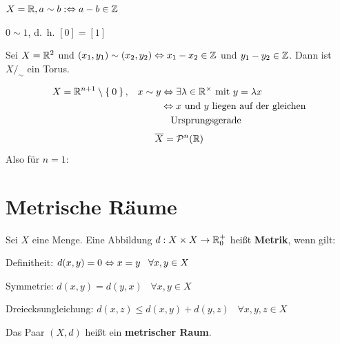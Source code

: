 \begin{beispiel}
    $X = \mathbb{R}, a \sim b :\Leftrightarrow a-b \in \mathbb{Z}$
    
    

    $0 \sim 1$, d.~h. $[0] = [1]$
\end{beispiel}

\begin{beispiel}
    Sei $X = \mathbb{R}^2$ und $(x_1, y_1) \sim (x_2, y_2) \Leftrightarrow x_1 - x_2 \in \mathbb{Z}$ 
    und $y_1 - y_2 \in \mathbb{Z}$. Dann ist $X /_\sim$ ein Torus.
\end{beispiel}

\begin{beispiel}%
    \begin{align*}
        X= \mdr^{n+1} \setminus \Set{0},\;\;\; x \sim y &\gdw \exists \lambda \in \mdr^\times \text{ mit } y = \lambda x\\
            &\gdw x \text{ und } y \text{ liegen auf der gleichen}\\
            &\hphantom{\gdw} \text{Ursprungsgerade}
    \end{align*}
    \[\overline{X} = \mathcal{P}^n(\mathbb{R})\]
    Also für $n=1$:\nopagebreak\\
    
\end{beispiel}

\section{Metrische Räume}
\begin{definition}%
    Sei $X$ eine Menge. Eine Abbildung $d:X\times X \rightarrow \mathbb{R}_0^+$
    heißt \textbf{Metrik}, wenn gilt:

    \begin{defenumprops}
        \item Definitheit:         \tabto{4cm} $d(x,y) = 0 \Leftrightarrow x = y \;\;\; \forall x, y \in X$
        \item Symmetrie:           \tabto{4cm} $d(x,y) = d(y,x) \;\;\; \forall x, y \in X$
        \item Dreiecksungleichung: \tabto{4cm} $d(x,z) \leq d(x,y) + d(y,z) \;\;\; \forall x, y, z \in X$
    \end{defenumprops}

    Das Paar $(X, d)$ heißt ein \textbf{metrischer Raum}.
\end{definition}

